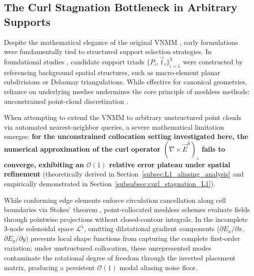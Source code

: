 \documentclass[preprint,12pt]{elsarticle}
\begin{document}
\subsection{The Curl Stagnation Bottleneck in Arbitrary Supports}
\label{subsec:curl_stagnation_bottleneck}

Despite the mathematical elegance of the original VNMM \cite{ortiz2021nodal, ortiz2023tese}, early formulations were fundamentally tied to structured support selection strategies. In foundational studies \cite{ortiz2021nodal, ortiz2023tese, goncalves2023vector}, candidate support triads $\{P_i, \vec{t}_i\}_{i=1}^3$ were constructed by referencing background spatial structures, such as macro-element planar subdivisions or Delaunay triangulations. While effective for canonical geometries, reliance on underlying meshes undermines the core principle of meshless methods: unconstrained point-cloud discretization \cite{liu2009mesh, goncalves2025tese}.

When attempting to extend the VNMM to arbitrary unstructured point clouds via automated nearest-neighbor queries, a severe mathematical limitation emerges: \textbf{for the unconstrained collocation setting investigated here, the numerical approximation of the curl operator $(\nabla \times \vec{E}^h)_z$ fails to converge, exhibiting an $\mathcal{O}(1)$ relative error plateau under spatial refinement} (theoretically derived in Section~\ref{subsec:L1_aliasing_analysis} and empirically demonstrated in Section~\ref{subsubsec:curl_stagnation_L1}).

While conforming edge elements enforce circulation cancellation along cell boundaries via Stokes' theorem \cite{nedelec1980mixed, monk2003finite}, point-collocated meshless schemes evaluate fields through pointwise projections without closed-contour integrals. In the incomplete 3-node solenoidal space $\mathcal{L}^1$, omitting dilatational gradient components ($\partial E_x/\partial x$, $\partial E_y/\partial y$) prevents local shape functions from capturing the complete first-order variation; under unstructured collocation, these unrepresented modes contaminate the rotational degree of freedom through the inverted placement matrix, producing a persistent $\mathcal{O}(1)$ modal aliasing noise floor.
\end{document}
